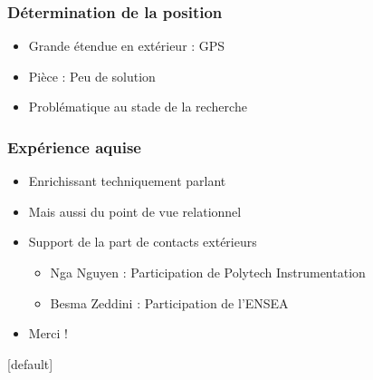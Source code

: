 \documentclass{beamer}
\begin{document}
{      \begin{frame}
	\frametitle{Détermination de la position}
	
	\begin{itemize}
	  \item Grande étendue en extérieur : GPS
	  \item Pièce : Peu de solution
	  \item Problématique au stade de la recherche
	\end{itemize}
      \end{frame}

      \begin{frame}
	\frametitle{Expérience aquise}
	
	\begin{itemize}
	  \item Enrichissant techniquement parlant
	  \item Mais aussi du point de vue relationnel
	  \item Support de la part de contacts extérieurs
	  \begin{itemize}
	   \item Nga Nguyen : Participation de Polytech Instrumentation
	   \item Besma Zeddini : Participation de l'ENSEA
	  \end{itemize}
	  \item Merci !
	\end{itemize}
      \end{frame}
  }
  
  \makeatletter
  [default]
  \def\beamer@entrycode{\vspace*{-\headheight}}
  \makeatother
  \begin{frame}
    \par
  \end{frame}
\end{document}
